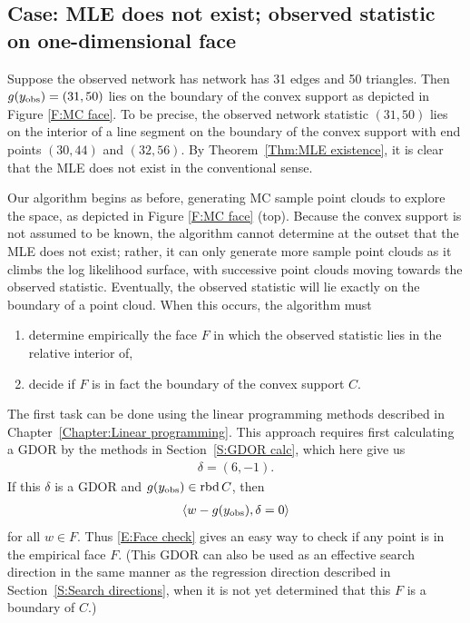 \subsection{Case: MLE does not exist; observed statistic on one-dimensional face}
Suppose the observed network has network has 31 edges and 50 triangles.  Then 
$g(y_{\text{obs}}) = (31,50)$ lies on the boundary of the convex support as depicted in 
Figure \ref{F:MC face}.  To be precise, the observed network statistic $(31,50)$ lies 
on the interior of a line segment on the boundary of the convex support with 
end points $(30,44)$ and $(32,56)$. 
By Theorem~\ref{Thm:MLE existence}, it is clear that the MLE does not exist
in the conventional sense.

Our algorithm begins as before, generating MC sample point clouds to explore the 
space, as depicted in Figure \ref{F:MC face} (top).  Because the convex 
support is not assumed to be known, 
the algorithm cannot determine at the outset that the MLE does 
not exist; rather, it can only generate more sample point clouds as it climbs the log 
likelihood surface, with successive point clouds moving towards the observed statistic.
Eventually, the observed statistic will lie exactly on the boundary of a point cloud.
When this occurs, the algorithm must 
\begin{enumerate}
\item determine empirically the face $F$ in which the observed statistic lies in the 
relative interior of,
\item decide if $F$ is in fact the boundary of the convex support $C$.
\end{enumerate}  

The first task can be done using the linear programming methods described 
in Chapter~\ref{Chapter:Linear programming}.  This approach requires first 
calculating a GDOR by the methods in Section~\ref{S:GDOR calc}, which here give us
\begin{align*}
	\delta = (6,-1).
\end{align*}
If this $\delta$ is a GDOR and $g(y_{\text{obs}}) \in \operatorname{rbd} C$, then 
\begin{align} \label{E:Face check}
	\langle w - g(y_{\text{obs}}), \delta=0 \rangle
\end{align}
for all $w \in F$.  Thus \eqref{E:Face check} gives an easy way to check if 
any point is in the empirical face $F$.
(This GDOR can also be used as an effective search direction 
in the same manner as the regression direction described in Section~\ref{S:Search directions}, when it is not yet determined that this $F$ is a boundary of $C$.)

